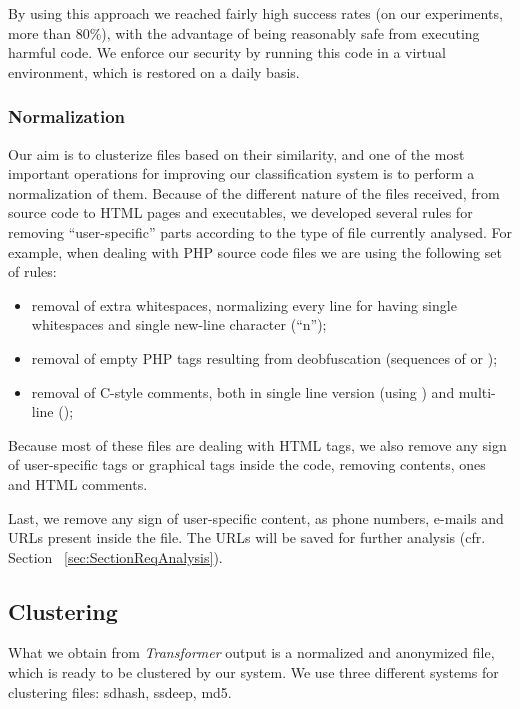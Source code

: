 By using this approach we reached fairly high success rates (on our experiments, more than 80\%), with the advantage of being reasonably safe from executing harmful code. We enforce our security by running this code in a virtual environment, which is restored on a daily basis.

\subsubsection{Normalization}
Our aim is to clusterize files based on their similarity, and one of the most important operations for improving our classification system is to perform a normalization of them.
Because of the different nature of the files received, from source code to HTML pages and executables, we developed several rules for removing ``user-specific'' parts according to the type of file currently analysed.
For example, when dealing with PHP source code files we are using the following set of rules:
\begin{itemize}
\item removal of extra whitespaces, normalizing every line for having single whitespaces and single new-line character (``\bs n'');
\item removal of empty PHP tags resulting from deobfuscation (sequences of  or ); %
\item removal of C-style comments, both in single line version (using \code{//}) and multi-line ();
\end{itemize}

Because most of these files are dealing with HTML tags, we also remove any sign of user-specific tags or graphical tags inside the code, removing  contents,  ones and HTML comments.

Last, we remove any sign of user-specific content, as phone numbers, e-mails and URLs present inside the file. The URLs will be saved for further analysis (cfr. Section ~\ref{sec:SectionReqAnalysis}).

\subsection{Clustering}
What we obtain from \emph{Transformer} output is a normalized and anonymized file, which is ready to be clustered by our system. We use three different systems for clustering files: sdhash, ssdeep, md5.

